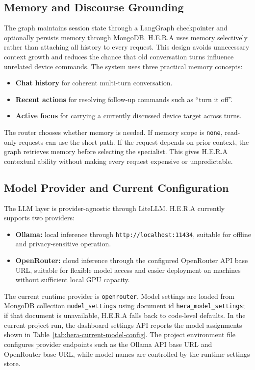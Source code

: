 \subsection{Memory and Discourse Grounding}

The graph maintains session state through a LangGraph checkpointer and optionally persists memory through MongoDB. H.E.R.A uses memory selectively rather than attaching all history to every request. This design avoids unnecessary context growth and reduces the chance that old conversation turns influence unrelated device commands. The system uses three practical memory concepts:

\begin{itemize}[leftmargin=*, itemsep=2pt]
    \item \textbf{Chat history} for coherent multi-turn conversation.
    \item \textbf{Recent actions} for resolving follow-up commands such as ``turn it off''.
    \item \textbf{Active focus} for carrying a currently discussed device target across turns.
\end{itemize}

The router chooses whether memory is needed. If memory scope is \texttt{none}, read-only requests can use the short path. If the request depends on prior context, the graph retrieves memory before selecting the specialist. This gives H.E.R.A contextual ability without making every request expensive or unpredictable.

\subsection{Model Provider and Current Configuration}

The LLM layer is provider-agnostic through LiteLLM. H.E.R.A currently supports two providers:

\begin{itemize}[leftmargin=*, itemsep=2pt]
    \item \textbf{Ollama:} local inference through \texttt{http://localhost:11434}, suitable for offline and privacy-sensitive operation.
    \item \textbf{OpenRouter:} cloud inference through the configured OpenRouter API base URL, suitable for flexible model access and easier deployment on machines without sufficient local GPU capacity.
\end{itemize}

The current runtime provider is \texttt{openrouter}. Model settings are loaded from MongoDB collection \texttt{model\_settings} using document id \texttt{hera\_model\_settings}; if that document is unavailable, H.E.R.A falls back to code-level defaults. In the current project run, the dashboard settings API reports the model assignments shown in Table~\ref{tab:hera-current-model-config}. The project environment file configures provider endpoints such as the Ollama API base URL and OpenRouter base URL, while model names are controlled by the runtime settings store.

